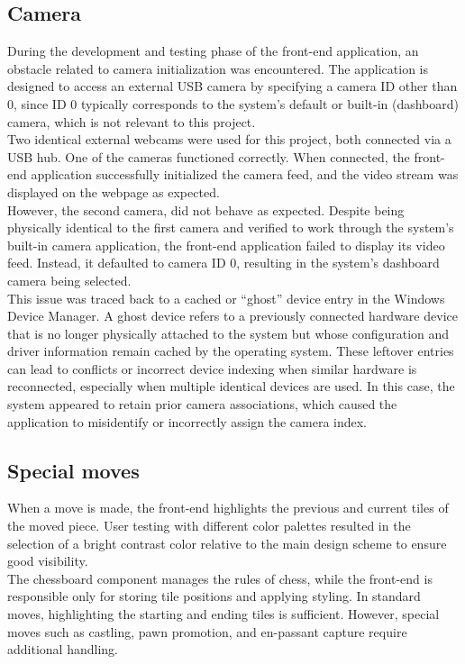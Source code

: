 \subsection{Camera}
During the development and testing phase of the front-end application, an obstacle related to camera initialization was encountered. The application is designed to access an external USB camera by specifying a camera ID other than 0, since ID 0 typically corresponds to the system's default or built-in (dashboard) camera, which is not relevant to this project.\\

Two identical external webcams were used for this project, both connected via a USB hub. One of the cameras functioned correctly. When connected, the front-end application successfully initialized the camera feed, and the video stream was displayed on the webpage as expected.\\

However, the second camera, did not behave as expected. Despite being physically identical to the first camera and verified to work through the system's built-in camera application, the front-end application failed to display its video feed. Instead, it defaulted to camera ID 0, resulting in the system's dashboard camera being selected.\\

This issue was traced back to a cached or “ghost” device entry in the Windows Device Manager. A ghost device refers to a previously connected hardware device that is no longer physically attached to the system but whose configuration and driver information remain cached by the operating system. These leftover entries can lead to conflicts or incorrect device indexing when similar hardware is reconnected, especially when multiple identical devices are used. In this case, the system appeared to retain prior camera associations, which caused the application to misidentify or incorrectly assign the camera index.

\subsection{Special moves}
When a move is made, the front-end highlights the previous and current tiles of the moved piece. User testing with different color palettes resulted in the selection of a bright contrast color relative to the main design scheme to ensure good visibility. \\

The chessboard component manages the rules of chess, while the front-end is responsible only for storing tile positions and applying styling. In standard moves, highlighting the starting and ending tiles is sufficient. However, special moves such as \gls{castling}, pawn \gls{promotion}, and \gls{en-passant} capture require additional handling. \\

